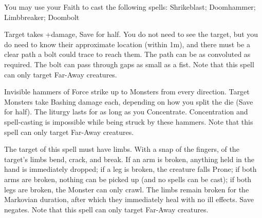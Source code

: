 {

You may use your Faith to cast the following spells: Shrikeblast; Doomhammer; Limbbreaker; Doombolt

\LITURGY [
  Name= Doombolt,
  Link= nergal-liturgy-doombolt,
  Paradigm= Force ,
  Save=  Y (half) ,
  Duration= 0 ,
  Counter=  n/a  ,
  Keywords= None ,
  Target=   Far-Away Monster
]



Target takes \SUMDICE+\DICE damage, Save for half. You do not need to see the target, but you do need to know their approximate location (within 1m), and there must be a clear path a bolt could trace to reach them. The path can be as convoluted as required. The bolt can pass through gaps as small as a fist.  Note that this spell can only target Far-Away creatures.
\LITURGY [
  Name= Doomhammer,
  Link=nergal-liturgy-doomhammer,
  Paradigm= Force ,
  Save=  Y (half) ,
  Duration= Concetration ,
  Counter=  n/a  ,
  Keywords= Splittable ,
  Target=   Far-Away Monster
]



Invisible hammers of Force strike up to \DICE Monsters from every direction.  Target Monsters take \DICE Bashing damage each, depending on how you split the die (Save for half).  The liturgy lasts for as long as you Concentrate.  Concentration and spell-casting is impossible while being struck by these hammers. Note that this spell can only target Far-Away creatures.

\LITURGY [
  Name= Limbbreaker,
  Link=nergal-liturgy-limbbreaker,
  Paradigm= Biomancy ,
  Save=  Y (negates) ,
  Duration= Markovian ,
  Counter=  n/a  ,
  Keywords= None ,
  Target=   Far-Away creature of \DICE+\DICE HD or less
]



The target of this spell must have limbs.  With a snap of the fingers, \DICE of the target's limbs bend, crack, and break.  If an arm is broken, anything held in the hand is immediately dropped; if a leg is broken, the creature falls Prone; if both arms are broken, nothing can be picked up (and no spells can be cast); if both legs are broken, the Monster can only crawl.  The limbs remain broken for the Markovian duration, after which they immediately heal with no ill effects. Save negates.  Note that this spell can only target Far-Away creatures.

\LITURGY [
  Name= Shrikeblast,
  Link=nergal-liturgy-shrikeblast,
  Paradigm= Force ,
  Save=  Y (half) ,
  Duration= 0 ,
  Counter=  n/a  ,
  Keywords= Splittable ,
  Target=   Far-Away Monster
]



}
